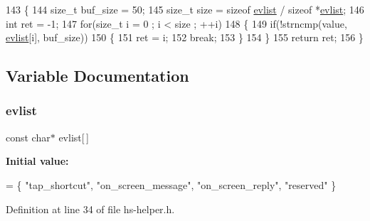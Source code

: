 \begin{DoxyCode}
143 \{
144     \textcolor{keywordtype}{size\_t} buf\_size = 50;
145     \textcolor{keywordtype}{size\_t} size = \textcolor{keyword}{sizeof} \hyperlink{hs-helper_8h_a0cd84b1a2184c9b84d1b7bf24582f28e}{evlist} / \textcolor{keyword}{sizeof} *\hyperlink{hs-helper_8h_a0cd84b1a2184c9b84d1b7bf24582f28e}{evlist};
146     \textcolor{keywordtype}{int} ret = -1;
147     \textcolor{keywordflow}{for}(\textcolor{keywordtype}{size\_t} i = 0 ; i < size ; ++i)
148     \{
149         \textcolor{keywordflow}{if}(!strncmp(value, \hyperlink{hs-helper_8h_a0cd84b1a2184c9b84d1b7bf24582f28e}{evlist}[i], buf\_size))
150         \{
151             ret = i;
152             \textcolor{keywordflow}{break};
153         \}
154     \}
155     \textcolor{keywordflow}{return} ret;
156 \}
\end{DoxyCode}


\subsection{Variable Documentation}
\mbox{\label{hs-helper_8h_a0cd84b1a2184c9b84d1b7bf24582f28e}} 
\subsubsection{\texorpdfstring{evlist}{evlist}}
{\footnotesize\ttfamily const char$\ast$ evlist\mbox{[}$\,$\mbox{]}\hspace{0.3cm}{\ttfamily [static]}}

{\bfseries Initial value\+:}
\begin{DoxyCode}
= \{
    \textcolor{stringliteral}{"tap\_shortcut"},
    \textcolor{stringliteral}{"on\_screen\_message"},
    \textcolor{stringliteral}{"on\_screen\_reply"},
    \textcolor{stringliteral}{"reserved"}
  \}
\end{DoxyCode}


Definition at line 34 of file hs-\/helper.\+h.

